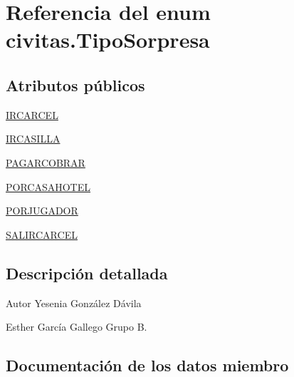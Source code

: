 \hypertarget{enumcivitas_1_1TipoSorpresa}{}\section{Referencia del enum civitas.\+Tipo\+Sorpresa}
\label{enumcivitas_1_1TipoSorpresa}
\subsection*{Atributos públicos}
\begin{DoxyCompactItemize}
\item 
\hyperlink{enumcivitas_1_1TipoSorpresa_afcb70a08bbda2b1fc9c41300be12cd02}{I\+R\+C\+A\+R\+C\+EL}
\item 
\hyperlink{enumcivitas_1_1TipoSorpresa_a6c2665bb8278c0f57a6611e277ba210a}{I\+R\+C\+A\+S\+I\+L\+LA}
\item 
\hyperlink{enumcivitas_1_1TipoSorpresa_a3d24bb84c0bc6661c90e10ae01990847}{P\+A\+G\+A\+R\+C\+O\+B\+R\+AR}
\item 
\hyperlink{enumcivitas_1_1TipoSorpresa_ad1e0eb521781b69d241bf56e6c3b7b8a}{P\+O\+R\+C\+A\+S\+A\+H\+O\+T\+EL}
\item 
\hyperlink{enumcivitas_1_1TipoSorpresa_ae11ec14f289080778747cedef3c96b07}{P\+O\+R\+J\+U\+G\+A\+D\+OR}
\item 
\hyperlink{enumcivitas_1_1TipoSorpresa_a95e9fc5b31f41acabea831a683602dfd}{S\+A\+L\+I\+R\+C\+A\+R\+C\+EL}
\end{DoxyCompactItemize}


\subsection{Descripción detallada}
\begin{DoxyAuthor}{Autor}
Yesenia González Dávila 

Esther García Gallego Grupo B. 
\end{DoxyAuthor}


\subsection{Documentación de los datos miembro}
\mbox{\label{enumcivitas_1_1TipoSorpresa_afcb70a08bbda2b1fc9c41300be12cd02}} 

